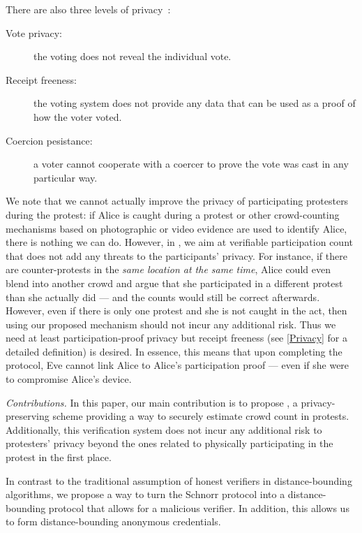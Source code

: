 There are also three levels of privacy~\cite{VerifyingPrivacyPropertiesOfVotingProtocols}:
\begin{description}
  \item[Vote privacy:] the voting does not reveal the individual vote.
  \item[Receipt freeness:] the voting system does not provide any data that can 
    be used as a proof of how the voter voted.
  \item[Coercion pesistance:] a voter cannot cooperate with a coercer to prove 
    the vote was cast in any particular way.
\end{description}
We note that we cannot actually improve the privacy of participating protesters during the protest: if Alice is caught during a protest or other crowd-counting mechanisms based on photographic or video evidence are used to identify Alice, there is nothing we can do. 
However, in \PRIVO, we aim at verifiable participation count that does not add any threats to the participants' privacy. 
For instance, if there are counter-protests in the \emph{same location at the same time}, Alice could even blend into another crowd and argue that she participated in a different protest than she actually did --- and the counts would still be correct afterwards.
However, even if there is only one protest and she is not caught in the act, then using our proposed mechanism should not incur any additional risk.
Thus we need at least participation-proof privacy but receipt freeness (see \cref{Privacy} for a detailed definition) is desired.
In essence, this means that upon completing the protocol, Eve cannot link Alice to Alice's participation proof --- even if she were to compromise Alice's device.

\emph{Contributions.} In this paper, our main contribution is to propose \PRIVO, a privacy-preserving scheme providing a way to securely estimate crowd count in protests.
Additionally, this verification system does not incur any additional risk to protesters' privacy beyond the ones related to physically participating in the protest in the first place.

In contrast to the traditional assumption of honest verifiers in distance-bounding algorithms, we propose a way to turn the Schnorr protocol into a distance-bounding protocol that allows for a malicious verifier.
In addition, this allows us to form distance-bounding anonymous credentials.

